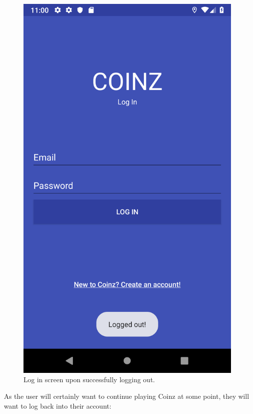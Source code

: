 \documentclass[11pt,a4paper,notitlepage]{article}
\begin{document}
\begin{figure}[H]
\begin{minipage}[t]{0.48\textwidth}
        \includegraphics[scale=0.2]{screenshots/log-out/logging-out.png}
        \caption{Log in screen upon successfully logging out.}
    \end{minipage}
\end{figure}

    As the user will certainly want to continue playing Coinz at some point, they will want to log back into their account:
 
\end{document}
